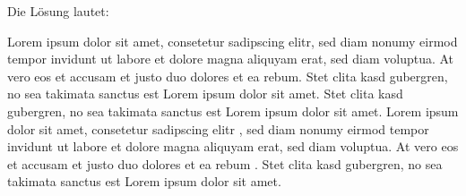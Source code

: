 Die Lösung lautet:
\begin{Loesung}
\lsgitem Lorem ipsum dolor sit amet, consetetur sadipscing elitr, sed diam nonumy eirmod tempor invidunt ut labore et dolore magna aliquyam erat, sed diam voluptua. At vero eos et accusam et justo duo dolores et ea rebum. Stet clita kasd gubergren, no sea takimata sanctus est Lorem ipsum dolor sit amet.
\lsgitem Stet clita kasd gubergren, no sea takimata sanctus est Lorem ipsum dolor sit amet. Lorem ipsum dolor sit amet, consetetur sadipscing elitr , sed diam nonumy eirmod tempor invidunt ut labore et dolore magna aliquyam erat, sed diam voluptua. 
\lsgitem At vero eos et accusam et justo duo dolores et ea rebum . Stet clita kasd gubergren, no sea takimata sanctus est Lorem ipsum dolor sit amet. 
\end{Loesung}
